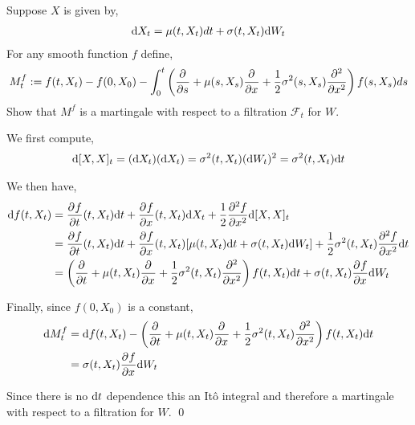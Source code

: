 \documentclass[10pt]{article}
\begin{document}
\begin{problem}[Exercise 8.4]
Suppose \( X \) is given by,
\begin{align*}
    \d X_t = \mu(t,X_t)dt + \sigma(t,X_t) \d W_t
\end{align*}
For any smooth function \( f \) define,
\begin{align*}
    M_t^f:= f(t,X_t) - f(0,X_0) - \int_{0}^{t} \left( \pp{}{s} + \mu(s,X_s)\pp{}{x} + \dfrac{1}{2}\sigma^2(s,X_s) \pp[2]{}{x} \right) f(s,X_s)ds
\end{align*}
    Show that \( M^f \) is a martingale with respect to a filtration \( \mathcal{F}_t \) for \( W \).
\end{problem}


\begin{solution}[Solution]
We first compute,
\begin{align*}
    \d[X,X]_t = (\d X_t)(\d X_t) = \sigma^2(t,X_t) (\d W_t)^2 = \sigma^2(t,X_t)\d t
\end{align*}

We then have,
\begin{align*}
    \d f(t,X_t) &= \pp{f}{t}(t,X_t) \d t + \pp{f}{x}(t,X_t) \d X_t + \dfrac{1}{2}\pp[2]{f}{x}\d[X,X]_t 
    \\&= \pp{f}{t}(t,X_t) \d t + \pp{f}{x}(t,X_t)  [\mu(t,X_t)\d t +  \sigma(t,X_t)\d W_t] + \dfrac{1}{2}\sigma^2(t,X_t) \pp[2]{f}{x} \d t 
    \\&= \left( \pp{}{t} + \mu(t,X_t) \pp{}{x} + \dfrac{1}{2}\sigma^2(t,X_t) \pp[2]{}{x} \right) f(t,X_t) \d t + \sigma(t,X_t) \pp{f}{x} \d W_t 
\end{align*}

Finally, since \( f(0,X_0) \) is a constant,
\begin{align*}
    \d M_t^f &= \d f(t,X_t) - \left( \pp{}{t} + \mu(t,X_t)\pp{}{x} + \dfrac{1}{2}\sigma^2(t,X_t) \pp[2]{}{x} \right) f(t,X_t) \d t \\
    &= \sigma(t,X_t) \pp{f}{x} \d W_t 
\end{align*}

Since there is no \( \d t \) dependence this an It\^o integral and therefore a martingale with respect to a filtration for \( W \). \qed
\end{solution}
\end{document}
